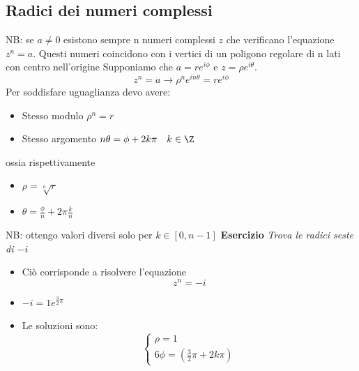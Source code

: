 \subsection{Radici dei numeri complessi}
NB: se $ a \neq 0$ esistono sempre n numeri complessi $z$ che verificano l'equazione $ z ^{ n } = a$. Questi numeri coincidono con i vertici di un poligono regolare di n lati con centro nell'origine
\vskip3mm
Supponiamo che $a = r e ^{ i \phi}$ e $ z = \rho e ^{ i \theta}$.
\[
	z^{n} = a \rightarrow \rho^{ n} e ^{ i n \theta} = r e ^{i \phi}
\]
Per soddisfare uguaglianza devo avere:
\begin{itemize}
	\item Stesso modulo $\rho ^{n}= r$
	\item Stesso argomento $n \theta = \phi + 2k \pi \quad  k  \in  \Z$
\end{itemize}
ossia rispettivamente
\begin{itemize}
	\item $\rho = \sqrt[n]{r} $
	\item $\theta = \frac{\phi}{n} + 2 \pi \frac{k}{n}$
\end{itemize}
NB: ottengo valori diversi solo per $k  \in  \left[ 0, n-1 \right] $
\textbf{Esercizio}
\textit{Trova le radici seste di $-i$}


\begin{itemize}
	\item Ciò corrisponde a risolvere l'equazione \[
	z^{n} = -i
	\] 
	\item $-i= 1e^{\frac{3}{2}\pi}$
	\item Le soluzioni sono: 
\[
\begin{cases}
	\rho = 1 \\
	6 \phi =\left( \frac{3}{2} \pi  + 2k\pi \right) 
\end{cases}
\] 
\end{itemize}
%
\begin{center}
\end{center}
